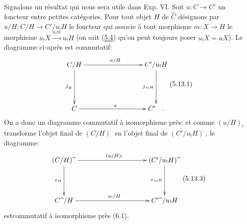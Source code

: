 \documentclass[10pt]{../fichiers-configuration-latex/smfart}
\begin{document}
\subsection{}

Signalons un résultat qui nous sera utile dans Exp. VI. Soit
$u:C\rightarrow C'$ un foncteur entre petites catégories. Pour tout
objet $H$ de $\widehat{C}$ désignons par
$u/H:C/H\rightarrow C'/u_{!}H$ le foncteur qui associe à tout
morphisme $m:X\rightarrow H$ le morphisme
$u_{!}X\xrightarrow{u_{!}m} u_{!}H$ (on sait (\hyperref[I.prop5.4]{5.4}) qu'on
peut toujours poser $u_{!}X=uX$). Le diagramme ci-après est
commutatif:
\[\vcenter{
\xymatrix@C=3cm@R=1.75cm{
C/H \ar[r]^{u/H}\ar[d]_{J_H} & C'/u_{!}H \ar[d]_{j_{u_{!}H}} \\
C\ar[r]^{u}   & C'\quad. }}\leqno{(5.13.1)}
\]
On a donc un diagramme commutatif à isomorphisme près:
et comme $(u/H)_{!}$ transforme l'objet final de
$(C/H)^{\widehat{\phantom{,}}}$ en l'objet final de
$(C'/u_{!}H)^{\widehat{\phantom{,}}}$, le diagramme:
\[\vcenter{
\xymatrix@C=3.5cm@R=1.5cm{ (C/H)\widehat{\phantom{a}}
\ar[r]^{(u/H)_!} \ar[d]_{e_H}&
  (C'/u_!H)\widehat{\phantom{a}} \ar[d]_{e_{u_{!}H}}\\
C\widehat{\phantom{a}}/H  \ar[r]^{u_{!}/H} &
C'\widehat{\phantom{a}}/u_{!}H }}\leqno{(5.13.3)}
\]
est\pageoriginale commutatif à isomorphisme près (6.1).
\end{document}
